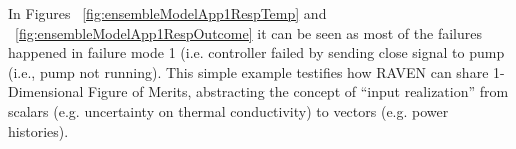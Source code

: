 In Figures ~\ref{fig:ensembleModelApp1RespTemp}  and ~\ref{fig:ensembleModelApp1RespOutcome}  it can be seen as most of the failures happened in failure mode 1 (i.e. controller failed by sending close signal to pump (i.e., pump not running).
This simple example testifies how RAVEN can share 1-Dimensional Figure of Merits, abstracting the concept of ``input realization'' from scalars (e.g. uncertainty on thermal conductivity) to vectors (e.g. power histories).